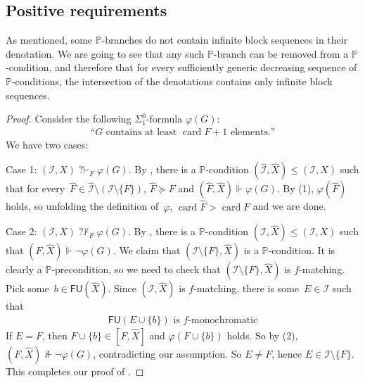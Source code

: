 \documentclass[10pt,a4paper]{article}
\def\PP{\mathbb{P}}
\def\I{\mathcal{I}}
\newcommand{\qvdash}{\operatorname{{?}{\vdash}}}
\newcommand{\nqvdash}{\operatorname{{?}{\nvdash}}}
\newcommand{\card}{\operatorname{card}}
\newcommand{\FU}[0]{\mathsf{FU}} %
\def\qt#1{``#1''}%
\def\h#1{\hat{#1}}
\numberwithin{theorem}{section}
\newtheorem{lemma}[theorem]{Lemma}
\begin{document}
\subsection{Positive requirements}

As mentioned, some $\PP$-branches do not contain infinite block sequences in their denotation.
We are going to see that any such $\PP$-branch can be removed from a $\PP$-condition, and therefore that for every sufficiently generic decreasing sequence of $\PP$-conditions, the intersection of the denotations contains only infinite block sequences.


\begin{proof}
Consider the following $\Sigma^0_1$-formula $\varphi(G)$:
\begin{align*}
\text{\qt{$G$ contains at least~$\card F + 1$ elements.}}
\end{align*}
We have two cases:
\smallskip

\noindent
Case 1: $(\I, X) \qvdash_F \varphi(G)$. By , there is a $\PP$-condition $(\h \I, \h X) \leq (\I, X)$ such that for every~$\h F \in \h \I \setminus (\I \setminus \{F\})$, $\h F \succeq F$ and $(\h F, \h X) \Vdash \varphi(G)$. By (1), $\varphi(\h F)$ holds, so unfolding the definition of~$\varphi$, $\card \h F > \card F$ and we are done.
\smallskip

\noindent
Case 2: $(\I, X) \nqvdash_F \varphi(G)$. By , there is a $\PP$-condition $(\I, \h X) \leq (\I, X)$ such that $(F, \h X) \Vdash \neg \varphi(G)$. We claim that $(\I \setminus \{F\}, \h X)$ is a $\PP$-condition.
It is clearly a $\PP$-precondition, so we need to check that $(\I \setminus \{F\}, \h X)$ is $f$-matching.
Pick some~$b \in \FU(\h X)$. Since $(\I, \h X)$ is $f$-matching, there is some~$E \in \I$ such that
\begin{align}
\text{$\FU(E \cup \{b\})$ is $f$-monochromatic}
\end{align}
If $E = F$, then $F \cup \{b\} \in [F, \h X]$ and $\varphi(F \cup \{b\})$ holds. So by (2), $(F, \h X) \not\Vdash \neg \varphi(G)$, contradicting our assumption. So $E \neq F$, hence $E \in \I \setminus \{F\}$.
This completes our proof of .
\end{proof}
\end{document}
